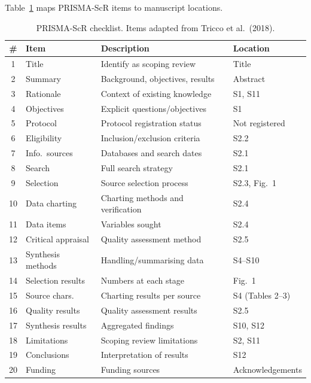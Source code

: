\documentclass[preprint,12pt]{elsarticle}
\begin{document}
Table~\ref{tab:prisma_checklist} maps PRISMA-ScR items \cite{tricco2018prisma_scr} to manuscript locations.

\begin{table}[htbp]
\centering
\caption{PRISMA-ScR checklist. Items adapted from Tricco et al.\ (2018).}
\label{tab:prisma_checklist}
\scriptsize
\setlength{\tabcolsep}{2pt}
\renewcommand{\arraystretch}{0.72}
\begin{tabular}{@{}clll@{}}
\toprule
\textbf{\#} & \textbf{Item} & \textbf{Description} & \textbf{Location} \\
\midrule
1  & Title              & Identify as scoping review        & Title \\
2  & Summary            & Background, objectives, results   & Abstract \\
3  & Rationale          & Context of existing knowledge     & S1, S11 \\
4  & Objectives         & Explicit questions/objectives      & S1 \\
5  & Protocol           & Protocol registration status       & Not registered \\
6  & Eligibility        & Inclusion/exclusion criteria       & S2.2 \\
7  & Info.\ sources     & Databases and search dates         & S2.1 \\
8  & Search             & Full search strategy               & S2.1 \\
9  & Selection          & Source selection process            & S2.3, Fig.~1 \\
10 & Data charting      & Charting methods and verification  & S2.4 \\
11 & Data items         & Variables sought                   & S2.4 \\
12 & Critical appraisal & Quality assessment method          & S2.5 \\
13 & Synthesis methods  & Handling/summarising data          & S4--S10 \\
14 & Selection results  & Numbers at each stage              & Fig.~1 \\
15 & Source chars.      & Charting results per source        & S4 (Tables 2--3) \\
16 & Quality results    & Quality assessment results         & S2.5 \\
17 & Synthesis results  & Aggregated findings                & S10, S12 \\
18 & Limitations        & Scoping review limitations         & S2, S11 \\
19 & Conclusions        & Interpretation of results          & S12 \\
20 & Funding            & Funding sources                    & Acknowledgements \\
\bottomrule
\end{tabular}
\end{table}



\end{document}
